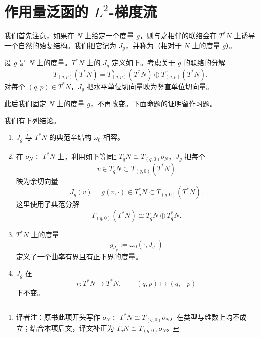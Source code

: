 \section{作用量泛函的 \texorpdfstring{$L^2$}{L²}-梯度流}
\label{sec:l2-gradient-flow-action-functional}

我们首先注意，如果在 $N$ 上给定一个\personRiemann{}度量 $g$，则与之相伴的\personLeviCivita{}联络会在 $T^*N$ 上诱导一个自然的殆复结构。我们把它记为 $J_g$，并称为（相对于 $N$ 上的度量 $g$）\emph{\termCanonicalAlmostComplexStructure{}}。

\begin{definition}
\label{def:canonical-almost-complex-cotangent}
设 $g$ 是 $N$ 上的\personRiemann{}度量。$T^*N$ 上的\termCanonicalAlmostComplexStructure{} $J_g$ 定义如下。考虑关于 $g$ 的\personLeviCivita{}联络的分解
\[
  T_{(q,p)}(T^*N)
  =T_{(q,p)}^h(T^*N)\oplus T_{(q,p)}^v(T^*N).
\]
对每个 $(q,p)\in T^*N$，$J_g$ 把水平单位切向量映为竖直单位切向量。
\end{definition}

此后我们固定 $N$ 上的\personRiemann{}度量 $g$，不再改变。下面命题的证明留作习题。

\begin{proposition}
\label{prop:canonical-almost-complex-properties}
我们有下列结论。
\begin{enumerate}[label=(\arabic*)]
  \item $J_g$ 与 $T^*N$ 的典范辛结构 $\omega_0$ 相容。
  \item 在\termZeroSection{} $o_N\subset T^*N$ 上，利用如下等同\footnote{译者注：原书此项开头写作 $o_N\subset T^*N\cong T_{(q,0)}o_N$，在类型与维数上均不成立；结合本项后文，译文补正为 $T_qN\cong T_{(q,0)}o_N$。} $T_qN\cong T_{(q,0)}o_N$，$J_g$ 把每个
  \[
    v\in T_qN\subset T_{(q,0)}(T^*N)
  \]
  映为余切向量
  \[
    J_g(v)=g(v,\mathord\cdot)\in T_q^*N\subset T_{(q,0)}(T^*N).
  \]
  这里使用了典范分解
  \[
    T_{(q,0)}(T^*N)\cong T_qN\oplus T_q^*N.
  \]
  \item $T^*N$ 上的度量
  \[
    g_{J_g}:=\omega_0(\mathord\cdot,J_g\mathord\cdot)
  \]
  定义了一个曲率有界且\termInjectivityRadius{}有正下界的\personRiemann{}度量。
  \item $J_g$ 在\termAntiSymplecticReflection{}
  \[
    r:T^*N\longrightarrow T^*N,
    \qquad (q,p)\longmapsto(q,-p)
  \]
  下不变。
\end{enumerate}
\end{proposition}

